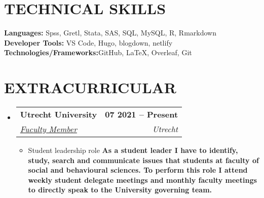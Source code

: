 \documentclass[letterpaper,11pt]{article}
\makeatletter
\newcommand{\resumeItem}[1]{
  \item\small{
    {#1 \vspace{-2pt}}
  }
}
\newcommand{\resumeSubheading}[4]{
  \vspace{-2pt}\item
    \begin{tabular*}{1.0\textwidth}[t]{l@{\extracolsep{\fill}}r}
      \textbf{\large#1} & \textbf{\small #2} \\
      \textit{\large#3} & \textit{\small #4} \\
      
    \end{tabular*}\vspace{-7pt}
}
\newcommand{\resumeSubHeadingListStart}{\begin{itemize}[leftmargin=0.0in, label={}]}
\newcommand{\resumeSubHeadingListEnd}{\end{itemize}}
\newcommand{\resumeItemListStart}{\begin{itemize}}
\newcommand{\resumeItemListEnd}{\end{itemize}\vspace{-5pt}}
\newcommand\sbullet[1][.5]{\mathbin{\vcenter{\hbox{\scalebox{#1}{$\bullet$}}}}}
\makeatother
\begin{document}
\section{TECHNICAL SKILLS}
 \begin{itemize}[leftmargin=0.15in, label={}]
    \small{\item{
     \textbf{\normalsize{Languages:}}{ \normalsize{Spss, Gretl, Stata, SAS, SQL, MySQL, R, Rmarkdown}} \\
     \textbf{\normalsize{Developer Tools:}}{ \normalsize{VS Code, Hugo, blogdown, netlify}} \\
     \textbf{\normalsize{Technologies/Frameworks:}}{\normalsize{GitHub, LaTeX, Overleaf, Git}} \\
    }}
 \end{itemize}
 \vspace{-15pt}


\section{EXTRACURRICULAR}
    \resumeSubHeadingListStart
        \resumeSubheading{Utrecht University \href{ https://www.uu.nl/en/organisation/methodology-and-statistics }{\raisebox{-0.1\height}\faExternalLink } }{07 2021 --  Present}{\underline{Fuculty Member}}{Utrecht}
            \resumeItemListStart
                \resumeItem{\normalsize{Student leadership role \textbf{ As a student leader I have to identify, study, search and communicate issues that students at faculty of social and behavioural sciences.
                To perform this role I attend weekly student delegate meetings and monthly faculty meetings to directly speak to the University governing team. }}}
            \resumeItemListEnd
    \resumeSubHeadingListEnd
 \vspace{-11pt}
 

\end{document}
